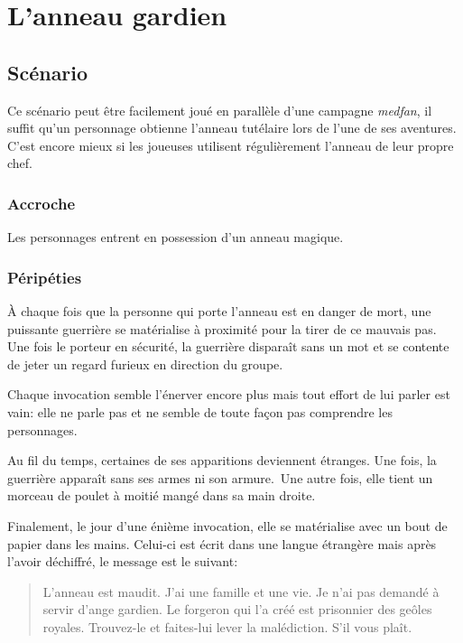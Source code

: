 \chapter{L'anneau gardien}

\section{Scénario}

Ce scénario peut être facilement joué en parallèle d'une campagne \emph{medfan}, il suffit qu'un personnage obtienne l'anneau tutélaire lors de l'une de ses aventures.
C'est encore mieux si les joueuses utilisent régulièrement l'anneau de leur propre chef.

\subsection*{Accroche}

Les personnages entrent en possession d'un anneau magique.

\subsection*{Péripéties}

À chaque fois que la personne qui porte l'anneau est en danger de mort, une puissante guerrière se matérialise à proximité pour la tirer de ce mauvais pas.
Une fois le porteur en sécurité, la guerrière disparaît sans un mot et se contente de jeter un regard furieux en direction du groupe.

Chaque invocation semble l'énerver encore plus mais tout effort de lui parler est vain: elle ne parle pas et ne semble de toute façon pas comprendre les personnages.

Au fil du temps, certaines de ses apparitions deviennent étranges.
Une fois, la guerrière apparaît sans ses armes ni son armure. Une autre fois, elle tient un morceau de poulet à moitié mangé dans sa main droite.

Finalement, le jour d'une énième invocation, elle se matérialise avec un bout de papier dans les mains.
Celui-ci est écrit dans une langue étrangère mais après l'avoir déchiffré, le message est le suivant:
\blockquote{L'anneau est maudit. J'ai une famille et une vie. Je n'ai pas demandé à servir d'ange gardien. Le forgeron qui l'a créé est prisonnier des geôles royales. Trouvez-le et faites-lui lever la malédiction. S'il vous plaît.}

